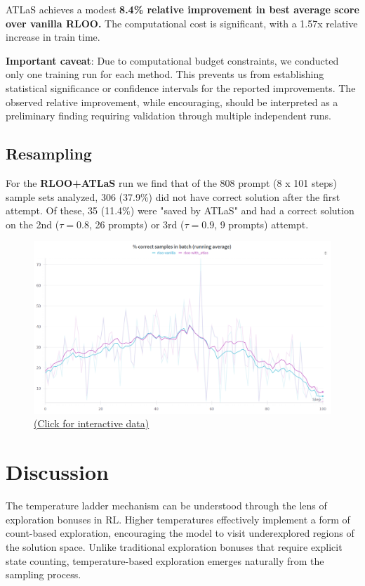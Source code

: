 \documentclass{article}
\begin{document}
ATLaS achieves a modest \textbf{8.4\% relative improvement in best average score over vanilla RLOO.} The computational cost is significant, with a 1.57x relative increase in train time.

\textbf{Important caveat}: Due to computational budget constraints, we conducted only one training run for each method. This prevents us from establishing statistical significance or confidence intervals for the reported improvements. The observed relative improvement, while encouraging, should be interpreted as a preliminary finding requiring validation through multiple independent runs.

\subsection{Resampling}

For the \textbf{RLOO+ATLaS} run we find that of the 808 prompt (8 x 101 steps) sample sets analyzed, 306 (37.9\%) did not have correct solution after the first attempt. Of these, 35 (11.4\%) were "saved by ATLaS" and had a correct solution on the 2nd ($\tau = 0.8$, 26 prompts) or 3rd ($\tau = 0.9$, 9 prompts) attempt.

\begin{figure}[H]
  \centering
  \includegraphics[width=0.8\columnwidth]{correct.png}
  \vspace{-10pt}
  \caption*{\href{https://wandb.ai/jonathanalgar/countdown-rl-prod/workspace/panel/qbxudix1v}{(Click for interactive data)}}
\end{figure}

\section{Discussion}

The temperature ladder mechanism can be understood through the lens of exploration bonuses in RL. Higher temperatures effectively implement a form of count-based exploration, encouraging the model to visit underexplored regions of the solution space. Unlike traditional exploration bonuses that require explicit state counting, temperature-based exploration emerges naturally from the sampling process.
\end{document}
